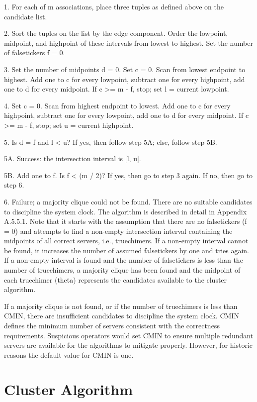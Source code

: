 1.  For each of m associations, place three tuples as defined above
on the candidate list.

2.  Sort the tuples on the list by the edge component.  Order the
lowpoint, midpoint, and highpoint of these intervals from lowest to
highest.  Set the number of falsetickers f = 0.

3.  Set the number of midpoints d = 0.  Set c = 0.  Scan from lowest
endpoint to highest.  Add one to c for every lowpoint, subtract one
for every highpoint, add one to d for every midpoint.  If c >= m - f,
stop; set l = current lowpoint.

4.  Set c = 0.  Scan from highest endpoint to lowest.  Add one to c
for every highpoint, subtract one for every lowpoint, add one to d
for every midpoint.  If c >= m - f, stop; set u = current highpoint.

5.  Is d = f and l < u?  If yes, then follow step 5A; else, follow
step 5B.

5A. Success: the intersection interval is [l, u].

5B. Add one to f.  Is f < (m / 2)?  If yes, then go to step 3 again.
If no, then go to step 6.

6.  Failure; a majority clique could not be found.  There are no
suitable candidates to discipline the system clock.
The algorithm is described in detail in Appendix A.5.5.1.  Note that
it starts with the assumption that there are no falsetickers (f = 0)
and attempts to find a non-empty intersection interval containing the
midpoints of all correct servers, i.e., truechimers.  If a non-empty
interval cannot be found, it increases the number of assumed
falsetickers by one and tries again.  If a non-empty interval is
found and the number of falsetickers is less than the number of
truechimers, a majority clique has been found and the midpoint of
each truechimer (theta) represents the candidates available to the
cluster algorithm.

If a majority clique is not found, or if the number of truechimers is
less than CMIN, there are insufficient candidates to discipline the
system clock.  CMIN defines the minimum number of servers consistent
with the correctness requirements.  Suspicious operators would set
CMIN to ensure multiple redundant servers are available for the
algorithms to mitigate properly.  However, for historic reasons the
default value for CMIN is one.

\section{Cluster Algorithm}

